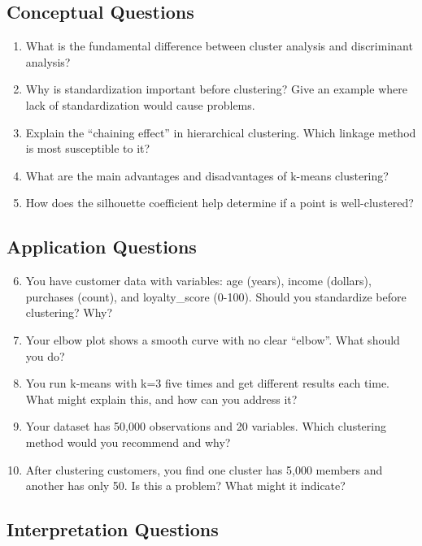 \documentclass[
]{article}
\begin{document}
\textbf{ }

\subsection{Conceptual Questions}

\begin{enumerate}
\item
  What is the fundamental difference between cluster analysis and
  discriminant analysis?
\item
  Why is standardization important before clustering? Give an example
  where lack of standardization would cause problems.
\item
  Explain the ``chaining effect'' in hierarchical clustering. Which
  linkage method is most susceptible to it?
\item
  What are the main advantages and disadvantages of k-means clustering?
\item
  How does the silhouette coefficient help determine if a point is
  well-clustered?
\end{enumerate}

\textbf{ }

\subsection{Application Questions}

\begin{enumerate}
\setcounter{enumi}{5}
\item
  You have customer data with variables: age (years), income (dollars),
  purchases (count), and loyalty\_score (0-100). Should you standardize
  before clustering? Why?
\item
  Your elbow plot shows a smooth curve with no clear ``elbow''. What
  should you do?
\item
  You run k-means with k=3 five times and get different results each
  time. What might explain this, and how can you address it?
\item
  Your dataset has 50,000 observations and 20 variables. Which
  clustering method would you recommend and why?
\item
  After clustering customers, you find one cluster has 5,000 members and
  another has only 50. Is this a problem? What might it indicate?
\end{enumerate}

\textbf{ }

\subsection{Interpretation Questions}
\end{document}
